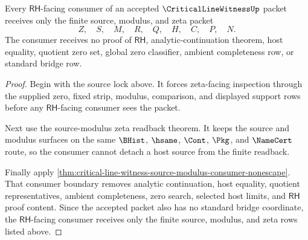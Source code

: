 \begin{theorem}
\label{thm:critical-line-witness-rh-consumer-source-nonescape}
Every $\mathsf{RH}$-facing consumer of an accepted
$\CriticalLineWitnessUp$ packet receives only the finite source, modulus, and
zeta packet
$$
Z,\quad S,\quad M,\quad R,\quad Q,\quad H,\quad C,\quad P,\quad N.
$$
The consumer receives no proof of $\mathsf{RH}$, analytic-continuation
theorem, host equality, quotient zero set, global zero classifier, ambient
completeness row, or standard bridge row.
\end{theorem}
\begin{proof}
Begin with the source lock above. It forces zeta-facing inspection through
the supplied zero, fixed strip, modulus, comparison, and displayed support
rows before any $\mathsf{RH}$-facing consumer sees the packet.

Next use the source-modulus zeta readback theorem. It keeps the source and
modulus surfaces on the same $\BHist$, $\hsame$, $\Cont$, $\Pkg$, and
$\NameCert$ route, so the consumer cannot detach a host source from the
finite readback.

Finally apply
\autoref{thm:critical-line-witness-source-modulus-consumer-nonescape}. That
consumer boundary removes analytic continuation, host equality, quotient
representatives, ambient completeness, zero search, selected host limits, and
$\mathsf{RH}$ proof content. Since the accepted packet also has no standard
bridge coordinate, the $\mathsf{RH}$-facing consumer receives only the finite
source, modulus, and zeta rows listed above.
\end{proof}
